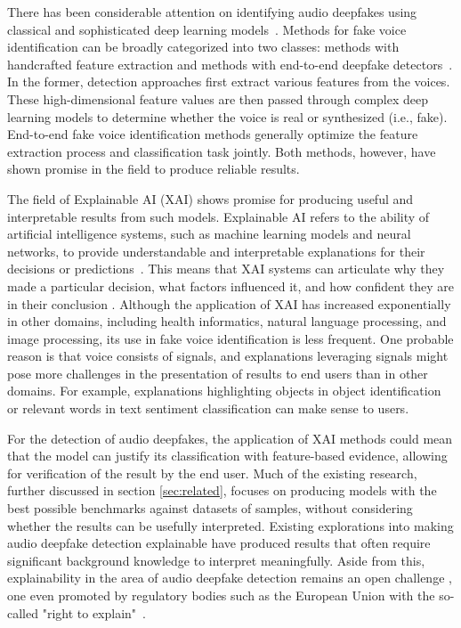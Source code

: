 \documentclass{article}
\begin{document}
There has been considerable attention on identifying audio deepfakes using classical and sophisticated deep learning models~\cite{wang2020deepsonar,becker2024audiomnist,muller_does_2022,yang_robust_2024,wang_asvspoof_2020}. Methods for fake voice identification can be broadly categorized into two classes: methods with handcrafted feature extraction and methods with end-to-end deepfake detectors~\cite{dixit2023review,li2025survey}. In the former, detection approaches first extract various features from the voices. These high-dimensional feature values are then passed through complex deep learning models to determine whether the voice is real or synthesized (i.e., fake). End-to-end fake voice identification methods generally optimize the feature extraction process and classification task jointly. Both methods, however, have shown promise in the field to produce reliable results.

The field of Explainable AI (XAI) shows promise for producing useful and interpretable results from such models. Explainable AI refers to the ability of artificial intelligence systems, such as machine learning models and neural networks, to provide understandable and interpretable explanations for their decisions or predictions~\cite{hind_explaining_2019}. This means that XAI systems can articulate why they made a particular decision, what factors influenced it, and how confident they are in their conclusion \cite{hind_explaining_2019}. Although the application of XAI has increased exponentially in other domains, including health informatics, natural language processing, and image processing, its use in fake voice identification is less frequent. One probable reason is that voice consists of signals, and explanations leveraging signals might pose more challenges in the presentation of results to end users than in other domains. For example, explanations highlighting objects in object identification or relevant words in text sentiment classification can make sense to users.

For the detection of audio deepfakes, the application of XAI methods could mean that the model can justify its classification with feature-based evidence, allowing for verification of the result by the end user. Much of the existing research, further discussed in section \ref{sec:related}, focuses on producing models with the best possible benchmarks against datasets of samples, without considering whether the results can be usefully interpreted. Existing explorations into making audio deepfake detection explainable have produced results that often require significant background knowledge to interpret meaningfully. Aside from this, explainability in the area of audio deepfake detection remains an open challenge \cite{cuccovillo_open_2022}, one even promoted by regulatory bodies such as the European Union with the so-called "right to explain"~\cite{goodman_european_2017}.
\end{document}
